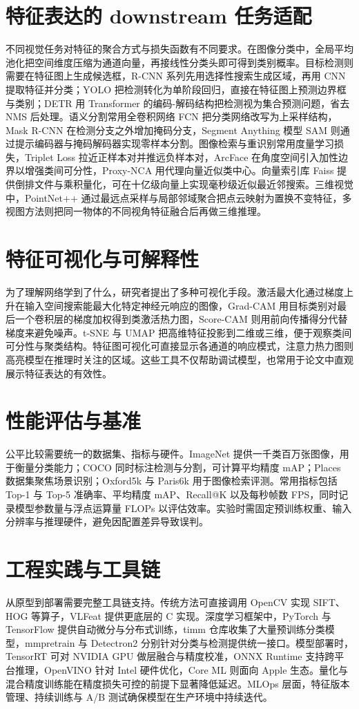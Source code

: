 \chapter{特征表达的 downstream 任务适配}
不同视觉任务对特征的聚合方式与损失函数有不同要求。在图像分类中，全局平均池化把空间维度压缩为通道向量，再接线性分类头即可得到类别概率。目标检测则需要在特征图上生成候选框，R-CNN 系列先用选择性搜索生成区域，再用 CNN 提取特征并分类；YOLO 把检测转化为单阶段回归，直接在特征图上预测边界框与类别；DETR 用 Transformer 的编码-解码结构把检测视为集合预测问题，省去 NMS 后处理。语义分割常用全卷积网络 FCN 把分类网络改写为上采样结构，Mask R-CNN 在检测分支之外增加掩码分支，Segment Anything 模型 SAM 则通过提示编码器与掩码解码器实现零样本分割。图像检索与重识别常用度量学习损失，Triplet Loss 拉近正样本对并推远负样本对，ArcFace 在角度空间引入加性边界以增强类间可分性，Proxy-NCA 用代理向量近似类中心。向量索引库 Faiss 提供倒排文件与乘积量化，可在十亿级向量上实现毫秒级近似最近邻搜索。三维视觉中，PointNet++ 通过最远点采样与局部邻域聚合把点云映射为置换不变特征，多视图方法则把同一物体的不同视角特征融合后再做三维推理。\par
\chapter{特征可视化与可解释性}
为了理解网络学到了什么，研究者提出了多种可视化手段。激活最大化通过梯度上升在输入空间搜索能最大化特定神经元响应的图像，Grad-CAM 用目标类别对最后一个卷积层的梯度加权得到类激活热力图，Score-CAM 则用前向传播得分代替梯度来避免噪声。t-SNE 与 UMAP 把高维特征投影到二维或三维，便于观察类间可分性与聚类结构。特征图可视化可直接显示各通道的响应模式，注意力热力图则高亮模型在推理时关注的区域。这些工具不仅帮助调试模型，也常用于论文中直观展示特征表达的有效性。\par
\chapter{性能评估与基准}
公平比较需要统一的数据集、指标与硬件。ImageNet 提供一千类百万张图像，用于衡量分类能力；COCO 同时标注检测与分割，可计算平均精度 mAP；Places 数据集聚焦场景识别；Oxford5k 与 Paris6k 用于图像检索评测。常用指标包括 Top-1 与 Top-5 准确率、平均精度 mAP、Recall@K 以及每秒帧数 FPS，同时记录模型参数量与浮点运算量 FLOPs 以评估效率。实验时需固定预训练权重、输入分辨率与推理硬件，避免因配置差异导致误判。\par
\chapter{工程实践与工具链}
从原型到部署需要完整工具链支持。传统方法可直接调用 OpenCV 实现 SIFT、HOG 等算子，VLFeat 提供更底层的 C 实现。深度学习框架中，PyTorch 与 TensorFlow 提供自动微分与分布式训练，timm 仓库收集了大量预训练分类模型，mmpretrain 与 Detectron2 分别针对分类与检测提供统一接口。模型部署时，TensorRT 可对 NVIDIA GPU 做层融合与精度校准，ONNX Runtime 支持跨平台推理，OpenVINO 针对 Intel 硬件优化，Core ML 则面向 Apple 生态。量化与混合精度训练能在精度损失可控的前提下显著降低延迟。MLOps 层面，特征版本管理、持续训练与 A/B 测试确保模型在生产环境中持续迭代。\par
